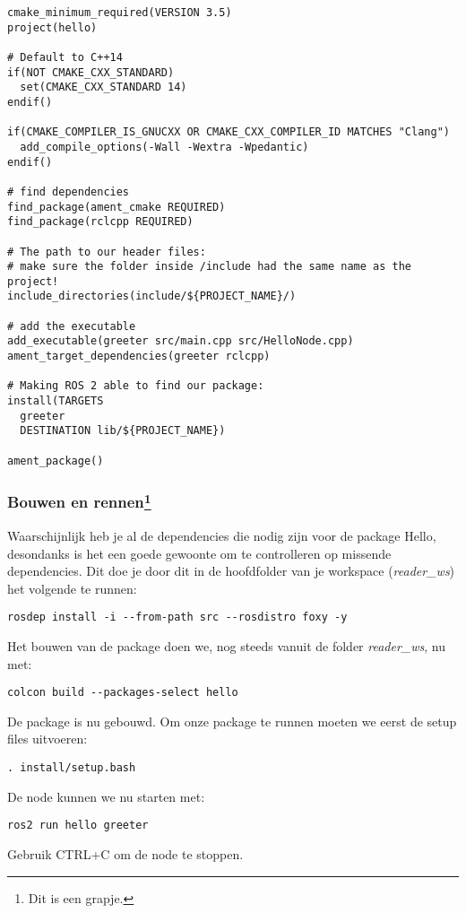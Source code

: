 \begin{lstlisting}
cmake_minimum_required(VERSION 3.5)
project(hello)

# Default to C++14
if(NOT CMAKE_CXX_STANDARD)
  set(CMAKE_CXX_STANDARD 14)
endif()

if(CMAKE_COMPILER_IS_GNUCXX OR CMAKE_CXX_COMPILER_ID MATCHES "Clang")
  add_compile_options(-Wall -Wextra -Wpedantic)
endif()

# find dependencies
find_package(ament_cmake REQUIRED)
find_package(rclcpp REQUIRED)

# The path to our header files:
# make sure the folder inside /include had the same name as the project!
include_directories(include/${PROJECT_NAME}/)

# add the executable
add_executable(greeter src/main.cpp src/HelloNode.cpp)
ament_target_dependencies(greeter rclcpp)

# Making ROS 2 able to find our package:
install(TARGETS
  greeter
  DESTINATION lib/${PROJECT_NAME})

ament_package()
\end{lstlisting}

\subsubsection[Bouwen en rennen]{Bouwen en rennen\footnote{Dit is een grapje.}}
Waarschijnlijk heb je al de dependencies die nodig zijn voor de package Hello, desondanks is het een goede gewoonte om te controlleren op missende dependencies. Dit doe je door dit in de hoofdfolder van je workspace (\textit{reader\_ws}) het volgende te runnen:

\begin{lstlisting}[style=DOS, caption={}, firstnumber=0, label={}]
 rosdep install -i --from-path src --rosdistro foxy -y
\end{lstlisting}

\noindent Het bouwen van de package doen we, nog steeds vanuit de folder \textit{reader\_ws}, nu met: 
\begin{lstlisting}[style=DOS, caption={}, firstnumber=0, label={}]
 colcon build --packages-select hello
\end{lstlisting}

\noindent De package is nu gebouwd. Om onze package te runnen moeten we eerst de setup files uitvoeren:
\begin{lstlisting}[style=DOS, caption={}, firstnumber=0, label={}]
 . install/setup.bash
\end{lstlisting}

\noindent De node kunnen we nu starten met:
\begin{lstlisting}[style=DOS, caption={}, firstnumber=0, label={}]
ros2 run hello greeter
\end{lstlisting}

\noindent Gebruik CTRL+C om de node te stoppen. 